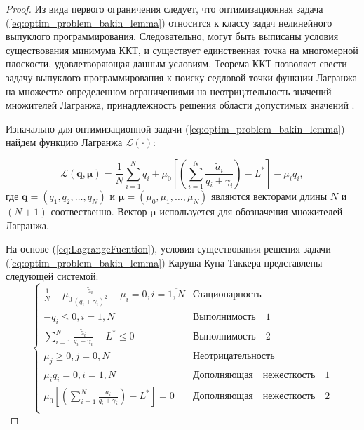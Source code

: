 \begin{proof}

Из вида первого ограничения следует, что оптимизационная задача (\ref{eq:optim_problem_bakin_lemma}) относится к классу задач нелинейного выпуклого программирования. Следовательно, могут быть выписаны условия существования минимума ККТ, и существует единственная точка на многомерной плоскости, удовлетворяющая данным условиям. Теорема ККТ позволяет свести задачу выпуклого программирования к поиску седловой точки функции Лагранжа на множестве определенном ограничениями на неотрицательность значений множителей Лагранжа, принадлежность решения области допустимых значений \cite{optimizations_methods}.

Изначально для оптимизационной задачи (\ref{eq:optim_problem_bakin_lemma}) найдем функцию Лагранжа $\mathcal{L}(\cdot)$:

\begin{equation}
\mathcal{L} (\boldsymbol{q}, \boldsymbol{\mu}) = \frac{1}{N} \sum\limits_{i=1}^{N}{q_i} + \mu_0 \left[ \left(\sum\limits_{i=1}^{N} {\frac{\tilde{a}_i}{q_i + \gamma_i}}\right) - L^{*}\right] - \mu_i q_i,
\label{eq:LagrangeFucntion}
\end{equation}
где $\boldsymbol{q}=(q_1, q_2, \ldots, q_N)$ и $\boldsymbol{\mu} = (\mu_0, \mu_1, \ldots, \mu_N)$ являются векторами длины $N$ и $(N+1)$ соотвественно. Вектор $\boldsymbol{\mu}$ используется для обозначения множителей Лагранжа.

На основе (\ref{eq:LagrangeFucntion}), условия существования решения задачи (\ref{eq:optim_problem_bakin_lemma}) Каруша-Куна-Таккера представлены следующей системой:
\begin{equation}
\label{eq:KKT}
\begin{cases}
\frac{1}{N} - \mu_0 \frac{\tilde{a}_i}{(q_i + \gamma_i)^2} - \mu_i = 0, i = \overline{1,N} & \boldsymbol{\mathrm{Стационарность}}\\
-q_i \leq 0, i = \overline{1,N} & \boldsymbol{\mathrm{Выполнимость \quad 1}}\\
\sum\limits_{i=1}^{N} {\frac{\tilde{a}_i}{q_i + \gamma_i}} - L^{*} \leq 0 & \boldsymbol{\mathrm{Выполнимость \quad 2}}\\
\mu_j \geq 0, j = \overline{0,N} & \boldsymbol{\mathrm{Неотрицательность}}\\
\mu_i q_i = 0, i = \overline{1,N} & \boldsymbol{\mathrm{Дополняющая \quad нежесткость \quad 1}}\\
\mu_0 \left[ \left(\sum\limits_{i=1}^{N} {\frac{\tilde{a}_i}{q_i + \gamma_i}}\right) - L^{*}\right] = 0 & \boldsymbol{\mathrm{Дополняющая \quad нежесткость \quad 2}}\\
\end{cases}
\end{equation}


\end{proof}
